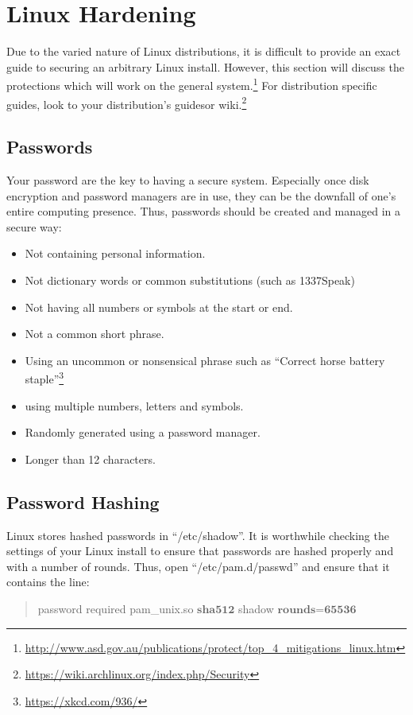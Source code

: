 \documentclass[a4paper,11pt]{report}
\begin{document}
	\section{Linux Hardening}
		Due to the varied nature of Linux distributions, it is difficult to provide an exact guide to securing an arbitrary Linux install. 
		However, this section will discuss the protections which will work on the general system.\footnote{\url{http://www.asd.gov.au/publications/protect/top\_4\_mitigations\_linux.htm}} 
		For distribution specific guides, look to your distribution's guides\cite{FedoraSecGuide}or wiki.\footnote{\url{https://wiki.archlinux.org/index.php/Security}}
		\subsection{Passwords} 
			Your password are the key to having a secure system. 
			Especially once disk encryption and password managers are in use, they can be the downfall of one's entire computing presence. 
			Thus, passwords should be created and managed in a secure way:
			\begin{itemize}
				\item Not containing personal information.
				\item Not dictionary words or common substitutions (such as 1337Speak)
				\item Not having all numbers or symbols at the start or end. 
				\item Not a common short phrase. 
				\item Using an uncommon or nonsensical phrase such as ``Correct horse battery staple''\footnote{\url{https://xkcd.com/936/}}
				\item using multiple numbers, letters and symbols. 
				\item Randomly generated using a password manager. %
				\item Longer than 12 characters. 
			\end{itemize}
		\subsection{Password Hashing}
			Linux stores hashed passwords in ``/etc/shadow''. 
			It is worthwhile checking the settings of your Linux install to ensure that passwords are hashed properly and with a number of rounds. Thus, open ``/etc/pam.d/passwd'' and ensure that it contains the line:
			\begin{quote}
				password required pam\_unix.so $\textbf{sha512}$ shadow $\textbf{rounds=65536}$
			\end{quote}
\end{document}
